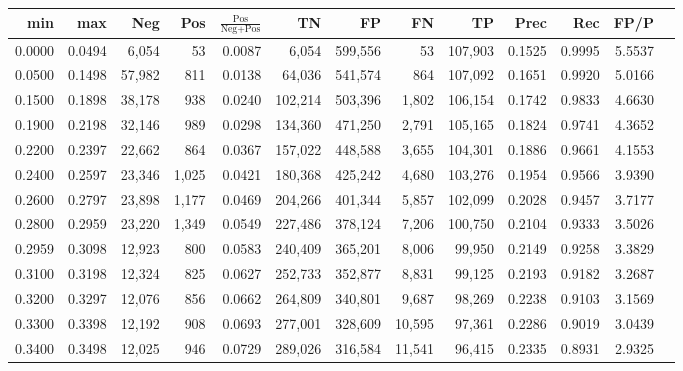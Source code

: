\begin{tabular}{rrrrrrrrrrrrr}
\toprule
   min &    max &    Neg &   Pos & $\frac{\text{Pos}}{\text{Neg}+\text{Pos}}$ &      TN &      FP &      FN &      TP &   Prec &    Rec &   FP/P \\
\midrule
0.0000 & 0.0494 &  6,054 &    53 &                                     0.0087 &   6,054 & 599,556 &      53 & 107,903 & 0.1525 & 0.9995 & 5.5537 \\
0.0500 & 0.1498 & 57,982 &   811 &                                     0.0138 &  64,036 & 541,574 &     864 & 107,092 & 0.1651 & 0.9920 & 5.0166 \\
0.1500 & 0.1898 & 38,178 &   938 &                                     0.0240 & 102,214 & 503,396 &   1,802 & 106,154 & 0.1742 & 0.9833 & 4.6630 \\
0.1900 & 0.2198 & 32,146 &   989 &                                     0.0298 & 134,360 & 471,250 &   2,791 & 105,165 & 0.1824 & 0.9741 & 4.3652 \\
0.2200 & 0.2397 & 22,662 &   864 &                                     0.0367 & 157,022 & 448,588 &   3,655 & 104,301 & 0.1886 & 0.9661 & 4.1553 \\
0.2400 & 0.2597 & 23,346 & 1,025 &                                     0.0421 & 180,368 & 425,242 &   4,680 & 103,276 & 0.1954 & 0.9566 & 3.9390 \\
0.2600 & 0.2797 & 23,898 & 1,177 &                                     0.0469 & 204,266 & 401,344 &   5,857 & 102,099 & 0.2028 & 0.9457 & 3.7177 \\
0.2800 & 0.2959 & 23,220 & 1,349 &                                     0.0549 & 227,486 & 378,124 &   7,206 & 100,750 & 0.2104 & 0.9333 & 3.5026 \\
0.2959 & 0.3098 & 12,923 &   800 &                                     0.0583 & 240,409 & 365,201 &   8,006 &  99,950 & 0.2149 & 0.9258 & 3.3829 \\
0.3100 & 0.3198 & 12,324 &   825 &                                     0.0627 & 252,733 & 352,877 &   8,831 &  99,125 & 0.2193 & 0.9182 & 3.2687 \\
0.3200 & 0.3297 & 12,076 &   856 &                                     0.0662 & 264,809 & 340,801 &   9,687 &  98,269 & 0.2238 & 0.9103 & 3.1569 \\
0.3300 & 0.3398 & 12,192 &   908 &                                     0.0693 & 277,001 & 328,609 &  10,595 &  97,361 & 0.2286 & 0.9019 & 3.0439 \\
0.3400 & 0.3498 & 12,025 &   946 &                                     0.0729 & 289,026 & 316,584 &  11,541 &  96,415 & 0.2335 & 0.8931 & 2.9325 \\

\end{tabular}
